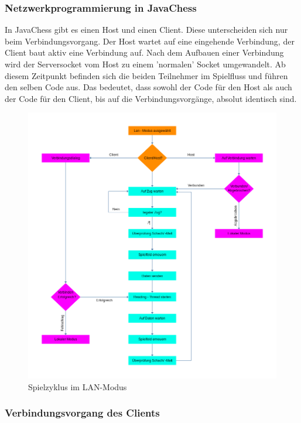 \documentclass[12pt,a4paper]{article}
\begin{document}
\subsubsection{Netzwerkprogrammierung in JavaChess}
\label{SUBSUBSEC:NETWORKJC}

In JavaChess gibt es einen Host und einen Client. Diese unterscheiden sich nur beim Verbindungsvorgang. Der Host wartet auf eine eingehende Verbindung, der Client baut aktiv eine Verbindung auf. Nach dem Aufbauen einer Verbindung wird der Serversocket vom Host zu einem 'normalen' Socket umgewandelt. Ab diesem Zeitpunkt befinden sich die beiden Teilnehmer im Spielfluss und führen den selben Code aus. Das bedeutet, dass sowohl der Code für den Host als auch der Code für den Client, bis auf die Verbindungsvorgänge, absolut identisch sind. 


\begin{figure}[H]
  \centering
   	\includegraphics[width=16cm]{graphics/SpielflussLAN.png}
  \caption{Spielzyklus im LAN-Modus}
  \label{fig:lan}
\end{figure}


\subsubsection{Verbindungsvorgang des Clients}
\label{SUBSUBSEC:CONCLI}
\end{document}
